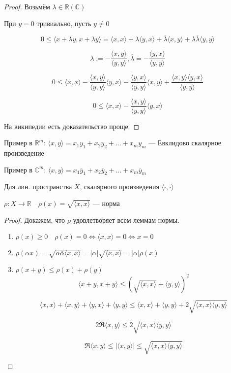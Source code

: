 \begin{proof}
    Возьмём $\lambda\in\mathbb{R} (\mathbb{C})$

    При $y=0$ тривиально, пусть $y\not = 0$

    $$0\leq \langle x + \lambda y,x + \lambda y\rangle = \langle x,x\rangle + \lambda\langle y,x\rangle + \overline\lambda\langle x,y\rangle+\lambda\overline\lambda\langle y,y\rangle$$

    $$\lambda := -\frac{\langle x,y\rangle}{\langle y,y\rangle}, \overline\lambda = -\frac{\langle y,x\rangle}{\langle y,y\rangle}$$

    $$0\leq\langle x,x\rangle - \frac{\langle x,y\rangle}{\langle y,y\rangle}\langle y,x\rangle - \frac{\langle y,x\rangle}{\langle y,y\rangle}\langle x,y\rangle+\frac{\langle x,y\rangle\langle y,x\rangle}{\langle y,y\rangle}$$

    $$0\leq \langle x,x\rangle - \frac{\langle x,y\rangle}{\langle y,y\rangle}\langle y,x\rangle$$

    На википедии есть доказательство проще.
\end{proof}

Пример в $\mathbb{R}^m$: $\langle x,y\rangle = x_1y_1+x_2y_2+\ldots+x_my_m$ --- Евклидово скалярное произведение

Пример в $\mathbb{C}^m$: $\langle x,y\rangle = x_1\overline y_1+x_2\overline y_2+\ldots+x_m\overline y_m$

\begin{lemma}
    Для лин. пространства $X$, скалярного произведения $\langle \cdot ,\cdot \rangle$
    
    $\rho:X\to\mathbb{R} \quad \rho(x)=\sqrt{\langle x,x\rangle}$ --- норма
\end{lemma}

\begin{proof}
    Докажем, что $\rho$ удовлетворяет всем леммам нормы.
    \begin{enumerate}
        \item $\rho(x)\geq 0\quad \rho(x)=0\Leftrightarrow \langle x,x\rangle=0\Leftrightarrow x=0$
        \item $\rho(\alpha x) = \sqrt{\alpha\overline\alpha\langle x,x\rangle}=|\alpha|\sqrt{\langle x,x\rangle}=|\alpha|\rho(x)$
        \item $\rho(x+y)\leq \rho(x)+\rho(y)$
        $$\langle x+y,x+y\rangle \leq (\sqrt{\langle x,x\rangle} + \langle y,y\rangle)^2$$

        $$\langle x,x\rangle+\langle x,y\rangle+\langle y,x\rangle+\langle y,y\rangle\leq \langle x,x\rangle + \langle y,y\rangle + 2\sqrt{\langle x,x\rangle\langle y,y\rangle}$$

        $$2\Re\langle x,y\rangle\leq 2\sqrt{\langle x,x\rangle\langle y,y\rangle}$$

        $$\Re\langle x,y\rangle \leq |\langle x,y\rangle|\leq\sqrt{\langle x,x\rangle\langle y,y\rangle}$$
    \end{enumerate}
\end{proof}

